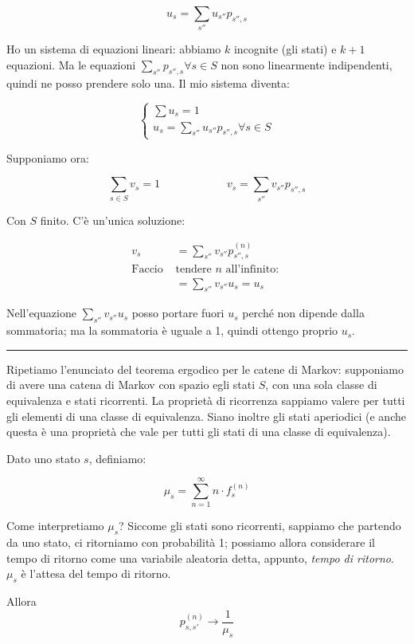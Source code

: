 \documentclass[a4paper,12pt]{book}
\newcommand\ddfrac[2]{\frac{\displaystyle #1}{\displaystyle #2}}
\begin{document}
$$ u_s = \sum_{s''} u_{s''}p_{s'',s}$$

Ho un sistema di equazioni lineari: abbiamo $ k $ incognite (gli stati) e $ k+1 $ equazioni. Ma le equazioni $ \sum_{s''} p_{s'', s}  \forall s \in S$ non sono linearmente indipendenti, quindi ne posso prendere solo una. Il mio sistema diventa:

$$ 
\begin{cases} \sum u_s = 1 \\ u_s = \sum_{s''} u_{s''}p_{s'',s} \forall s \in S \end{cases} 
$$

Supponiamo ora:

$$ \sum_{s \in S} v_s = 1 \qquad \qquad \qquad v_s = \sum_{s''} v_{s''}p_{s'',s} $$

Con $ S $ finito. C'è un'unica soluzione:

\begin{align*}
	v_s & = \sum_{s''}v_{s''}p_{s'',s}^{(n)} \\
	 \text{Faccio } & \text{tendere } n \text{ all'infinito: }\\
	& = \sum_{s''}v_{s''}u_s = u_s
\end{align*}

Nell'equazione $ \sum_{s''}v_{s''}u_s $ posso portare fuori $ u_s $ perché non dipende dalla sommatoria; ma la sommatoria è uguale a 1, quindi ottengo proprio $ u_s $.

\vspace{1cm}
\hrule 
\vspace{1cm}

Ripetiamo l'enunciato del teorema ergodico per le catene di Markov: supponiamo di avere una catena di Markov con spazio egli stati $ S $, con una sola classe di equivalenza e stati ricorrenti. La proprietà di ricorrenza sappiamo valere per tutti gli elementi di una classe di equivalenza. Siano inoltre gli stati aperiodici (e anche questa è una proprietà che vale per tutti gli stati di una classe di equivalenza).

Dato uno stato $ s $, definiamo:

$$ \mu_s = \sum_{n=1}^{\infty} n \cdot f_s^{(n)} $$

Come interpretiamo $ \mu_s $? Siccome gli stati sono ricorrenti, sappiamo che partendo da uno stato, ci ritorniamo con probabilità 1; possiamo allora considerare il tempo di ritorno come una variabile aleatoria detta, appunto, \textit{tempo di ritorno}. $ \mu_s $ è l'attesa del tempo di ritorno. 

Allora 
$$ p_{s,s'}^{(n)} \to \ddfrac{1}{\mu_s} $$
\end{document}
